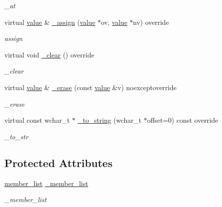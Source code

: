 \begin{DoxyCompactItemize}
\begin{DoxyCompactList}\small\item\em \+\_\+at \end{DoxyCompactList}\item 
virtual \hyperlink{classformat_1_1value_aa6b85823936bf7b8ab78d3f8d443c00d}{value} \& \hyperlink{classformat_1_1object_ad1b5cd15cd7db0d3afba5ec5fa713a1e}{\+\_\+assign} (\hyperlink{classformat_1_1value_aa6b85823936bf7b8ab78d3f8d443c00d}{value} $\ast$ov, \hyperlink{classformat_1_1value_aa6b85823936bf7b8ab78d3f8d443c00d}{value} $\ast$nv) override
\begin{DoxyCompactList}\small\item\em assign \end{DoxyCompactList}\item 
virtual void \hyperlink{classformat_1_1object_ac6db5016da29f906f67d293b27c8bb34}{\+\_\+clear} () override\hypertarget{classformat_1_1object_ac6db5016da29f906f67d293b27c8bb34}{}\label{classformat_1_1object_ac6db5016da29f906f67d293b27c8bb34}

\begin{DoxyCompactList}\small\item\em \+\_\+clear \end{DoxyCompactList}\item 
virtual \hyperlink{classformat_1_1value_aa6b85823936bf7b8ab78d3f8d443c00d}{value} \& \hyperlink{classformat_1_1object_a8da91a2e94cea219e1462d7857f27af7}{\+\_\+erase} (const \hyperlink{classformat_1_1value_aa6b85823936bf7b8ab78d3f8d443c00d}{value} \&v) noexceptoverride
\begin{DoxyCompactList}\small\item\em \+\_\+erase \end{DoxyCompactList}\item 
virtual const wchar\+\_\+t $\ast$ \hyperlink{classformat_1_1object_ade521091c997a1a61e15122364c32e99}{\+\_\+to\+\_\+string} (wchar\+\_\+t $\ast$offset=0) const override
\begin{DoxyCompactList}\small\item\em \+\_\+to\+\_\+str \end{DoxyCompactList}\end{DoxyCompactItemize}
\subsection*{Protected Attributes}
\begin{DoxyCompactItemize}
\item 
\hyperlink{classformat_1_1object_a832cdbf5fe57050ca910fd2e98f53e44}{member\+\_\+list} \hyperlink{classformat_1_1object_ac49dd2aada563d000599673d55effd0b}{\+\_\+member\+\_\+list}\hypertarget{classformat_1_1object_ac49dd2aada563d000599673d55effd0b}{}\label{classformat_1_1object_ac49dd2aada563d000599673d55effd0b}

\begin{DoxyCompactList}\small\item\em \+\_\+member\+\_\+list \end{DoxyCompactList}\end{DoxyCompactItemize}
